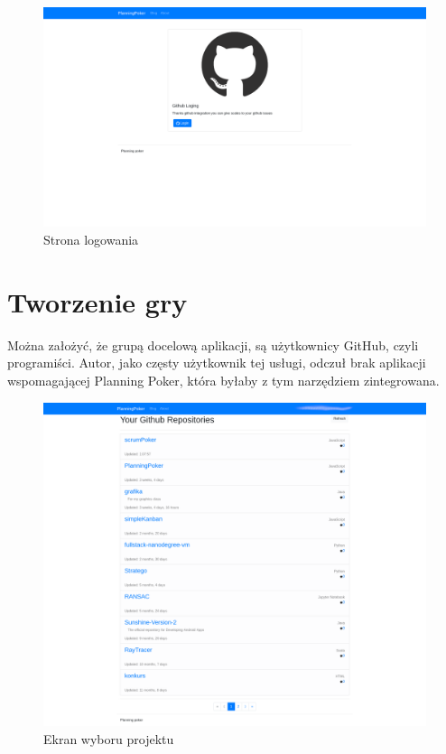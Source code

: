 \begin{figure}[h]
	\centering\includegraphics[width=\textwidth]{img/GitLogin.png}
	\caption{Strona logowania}\label{rys:login}%
\end{figure}

\section{Tworzenie gry}

Można założyć, że grupą docelową aplikacji, są użytkownicy GitHub, czyli programiści.
Autor, jako częsty użytkownik tej usługi, odczuł brak aplikacji wspomagającej Planning Poker,
która byłaby z tym narzędziem zintegrowana.

\begin{figure}[h]
	\centering\includegraphics[width=\textwidth]{img/repositories.png}
	\caption{Ekran wyboru projektu}\label{rys:projekty}%
\end{figure}

